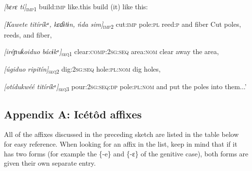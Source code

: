 \textit{[bɛrɛ     tí]}\textsc{\textsubscript{imp1}}
build:\textsc{imp}   like.this
build (it) like this:



\textit{[Kawete   titíríkᵃ,   kɛɗɨtɨn,   ńda   sim]}\textsc{\textsubscript{imp2}}
cut:\textsc{imp}   pole:\textsc{pl}   reed:\textsc{p}    and   fiber
Cut poles, reeds, and fiber,



\textit{[iréɲuƙoidu}\textit{o}\textit{     bácɨkᵃ]}\textsc{\textsubscript{seq1}}
clear:\textsc{comp:2sg:seq}   area:\textsc{nom}
clear away the area,



\textit{[úgidu}\textit{o}\textit{   ripitín]}\textsc{\textsubscript{seq2}}
dig:\textsc{2sg:seq}   hole:\textsc{pl:nom}
dig holes,



\textit{[otíduk}\textit{w}\textit{éé     titíríkᵃ]}\textsc{\textsubscript{seq3}}
pour:\textsc{2sg:seq:dp}   pole:\textsc{pl:nom}
and put the poles into them...’


\subsection{Appendix A: Icétôd affixes}

All of the affixes discussed in the preceding sketch are listed in the table below for easy reference. When looking for an affix in the list, keep in mind that if it has two forms (for example the \{-e\} and \{-ɛ\} of the genitive case), both forms are given their own separate entry.

